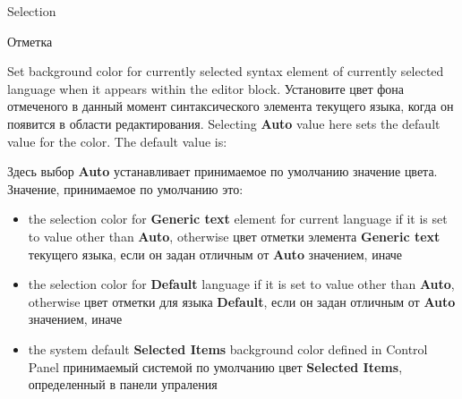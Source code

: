 \begin{popup}
\ifenglish
\caption{Selection}
\else
\caption{Отметка}
\fi
{}

\ifenglish
Set background color for currently selected syntax element of currently selected
language when it appears within the editor block.
\else
Установите цвет фона отмеченого в данный момент синтаксического элемента
текущего языка, когда он появится в области редактирования.
\fi
\ifenglish
Selecting {\bf Auto} value here sets the default value for the color. The default
value is:

\else
Здесь выбор {\bf Auto} устанавливает принимаемое по умолчанию значение цвета.
Значение, принимаемое по умолчанию это: 
\fi

\begin{itemize}
\item 
 \ifenglish
 the selection color for {\bf Generic text} element for current language
 if it is set  to value other than {\bf Auto}, otherwise
 \else
 цвет отметки элемента {\bf Generic text} текущего языка, если он задан
  отличным от {\bf Auto} значением, иначе
 \fi
\item 
 \ifenglish
 the selection color for {\bf Default} language
 if it is set  to value other than {\bf Auto}, otherwise
 \else
 цвет отметки для языка {\bf Default}, если он задан отличным от {\bf Auto}
 значением, иначе
 \fi
\item 
 \ifenglish
the system default {\bf Selected Items} background color defined
in Control Panel
  \else
  принимаемый системой по умолчанию цвет  {\bf Selected Items},
  определенный в панели упраления
  \fi
\end{itemize}
\end{popup}


